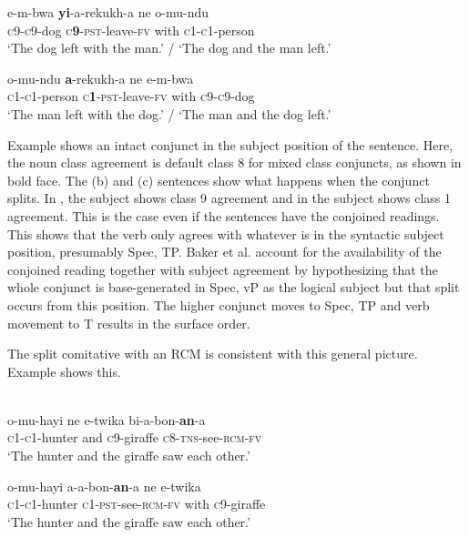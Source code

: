 \documentclass[output=paper]{langsci/langscibook}
\begin{document}
\ex\label{ex:safir:20b}
\gll   e-m-bwa  \textbf{{yi}}-a-rekukh-a     ne   o-mu-ndu\\
       \textsc{c9-c9}-dog  \textsc{c}\textbf{9}-\textsc{pst}-leave-\textsc{fv}   with   \textsc{c1-c1}-person\\
\glt   ‘The dog left with the man.’ / ‘The dog and the man left.’

\ex\label{ex:safir:20c}
\gll   o-mu-ndu   \textbf{a}-rekukh-a     ne   e-m-bwa\\
       \textsc{c1-c1}-person   \textsc{c}\textbf{1}-\textsc{pst}-leave-\textsc{fv}   with   \textsc{c9-c9}-dog\\
\glt   ‘The man left with the dog.’ / ‘The man and the dog left.’
\z
\z

Example  shows an intact conjunct in the subject position of the sentence. Here, the noun class agreement is default class 8 for mixed class conjuncts, as shown in bold face. The (b) and (c) sentences show what happens when the conjunct splits. In , the subject shows class 9 agreement and in  the subject shows class 1 agreement. This is the case even if the sentences have the conjoined readings. This shows that the verb only agrees with whatever is in the syntactic subject position, presumably Spec, TP. Baker et al. account for the availability of the conjoined reading together with subject agreement by hypothesizing that the whole conjunct is base-generated in Spec, vP as the logical subject but that split occurs from this position. The higher conjunct moves to Spec, TP and verb movement to T results in the surface order.  

The split comitative with an RCM is consistent with this general picture. Example  shows this.


\ea\label{ex:safir:21}
  \\
\ea\label{ex:safir:21a}
\gll  o-mu-hayi   ne   e-twika   bi-a-bon-\textbf{an}-a  \\
       \textsc{c1-c1}-hunter   and   \textsc{c}9-giraffe   \textsc{c8-tns}-see-\textsc{rcm}\textsc{-fv} \\
\glt   ‘The hunter and the giraffe saw each other.’

\ex\label{ex:safir:21b}
\gll   o-mu-hayi     a-a-bon-\textbf{an}-a     ne   e-twika\\
       \textsc{c1-c1}-hunter    \textsc{c1-pst}-see-\textsc{rcm}\textsc{-fv}  with  \textsc{c}9-giraffe   \\
\glt   ‘The hunter and the giraffe saw each other.’
\z
\z
\end{document}
